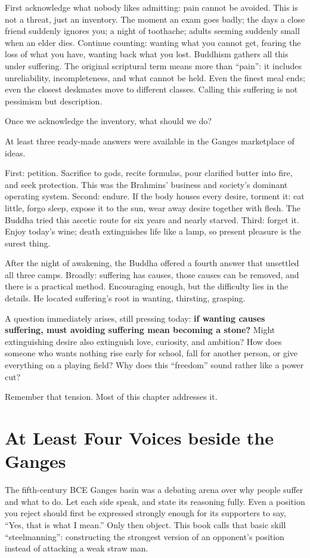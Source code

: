 First acknowledge what nobody likes admitting: pain cannot be avoided. This is not a threat, just an inventory. The moment an exam goes badly; the days a close friend suddenly ignores you; a night of toothache; adults seeming suddenly small when an elder dies. Continue counting: wanting what you cannot get, fearing the loss of what you have, wanting back what you lost. Buddhism gathers all this under suffering. The original scriptural term means more than ``pain'': it includes unreliability, incompleteness, and what cannot be held. Even the finest meal ends; even the closest deskmates move to different classes. Calling this suffering is not pessimism but description.

Once we acknowledge the inventory, what should we do?

At least three ready-made answers were available in the Ganges marketplace of ideas.

First: petition. Sacrifice to gods, recite formulas, pour clarified butter into fire, and seek protection. This was the Brahmins' business and society's dominant operating system. Second: endure. If the body houses every desire, torment it: eat little, forgo sleep, expose it to the sun, wear away desire together with flesh. The Buddha tried this ascetic route for six years and nearly starved. Third: forget it. Enjoy today's wine; death extinguishes life like a lamp, so present pleasure is the surest thing.

After the night of awakening, the Buddha offered a fourth answer that unsettled all three camps. Broadly: suffering has causes, those causes can be removed, and there is a practical method. Encouraging enough, but the difficulty lies in the details. He located suffering's root in wanting, thirsting, grasping.

A question immediately arises, still pressing today: \textbf{if wanting causes suffering, must avoiding suffering mean becoming a stone?} Might extinguishing desire also extinguish love, curiosity, and ambition? How does someone who wants nothing rise early for school, fall for another person, or give everything on a playing field? Why does this ``freedom'' sound rather like a power cut?

Remember that tension. Most of this chapter addresses it.

\section{At Least Four Voices beside the Ganges}
The fifth-century BCE Ganges basin was a debating arena over why people suffer and what to do. Let each side speak, and state its reasoning fully. Even a position you reject should first be expressed strongly enough for its supporters to say, ``Yes, that is what I mean.'' Only then object. This book calls that basic skill ``steelmanning'': constructing the strongest version of an opponent's position instead of attacking a weak straw man.

